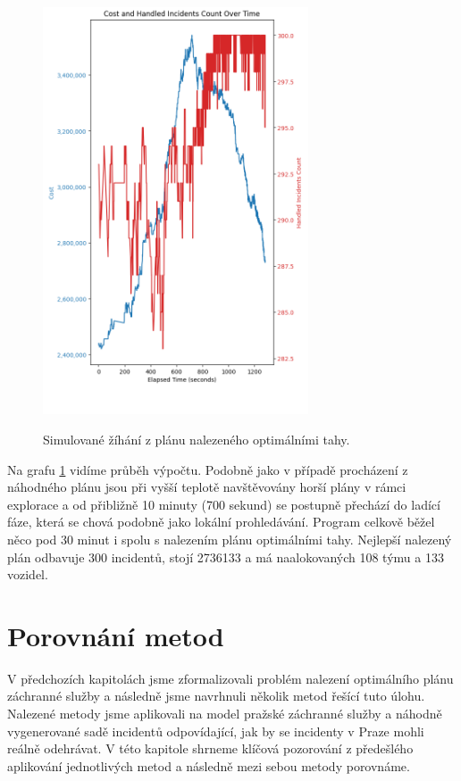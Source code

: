 \begin{figure}[H]
  \caption{Simulované žíhání z plánu nalezeného optimálními tahy.}
  \includegraphics[width=0.7\textwidth,height=0.9\textwidth]{img/plots/sa_optimal.png}
  \centering
  \label{img:sa_optimal}
\end{figure}

Na grafu \ref{img:sa_optimal} vidíme průběh výpočtu.
Podobně jako v případě procházení z náhodného plánu jsou při vyšší teplotě navštěvovány horší plány v rámci explorace a od přibližně 
10 minuty (700 sekund) se postupně přechází do ladící fáze, která se chová podobně jako lokální prohledávání.
Program celkově běžel něco pod 30 minut i spolu s nalezením plánu optimálními tahy.
Nejlepší nalezený plán odbavuje 300 incidentů, stojí 2736133 a má naalokovaných 108 týmu a 133 vozidel.

\section{Porovnání metod}

V předchozích kapitolách jsme zformalizovali problém nalezení optimálního plánu záchranné služby a následně jsme navrhnuli několik metod řešící tuto úlohu.
Nalezené metody jsme aplikovali na model pražské záchranné služby a náhodně vygenerované sadě incidentů odpovídající, jak by se incidenty v Praze mohli reálně odehrávat.
V této kapitole shrneme klíčová pozorování z předešlého aplikování jednotlivých metod a následně mezi sebou metody porovnáme. 

